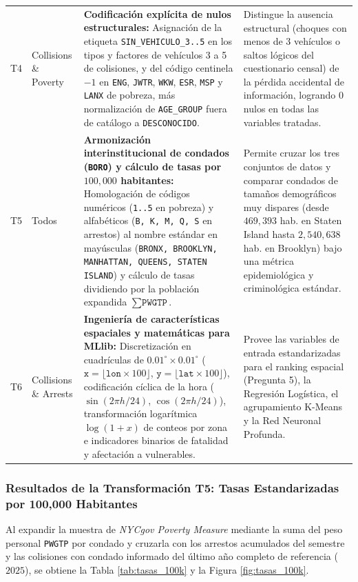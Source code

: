 \documentclass[11pt,a4paper]{article}
\begin{document}
\begin{table}[H]
\begin{tabularx}{\linewidth}{c l >{\raggedright\arraybackslash}p{4.3cm} X}
T4 & Collisions \& Poverty & \textbf{Codificación explícita de nulos estructurales:} Asignación de la etiqueta \texttt{SIN\_VEHICULO\_3..5} en los tipos y factores de vehículos 3 a 5 de colisiones, y del código centinela $-1$ en \texttt{ENG}, \texttt{JWTR}, \texttt{WKW}, \texttt{ESR}, \texttt{MSP} y \texttt{LANX} de pobreza, más normalización de \texttt{AGE\_GROUP} fuera de catálogo a \texttt{DESCONOCIDO}. & Distingue la ausencia estructural (choques con menos de 3 vehículos o saltos lógicos del cuestionario censal) de la pérdida accidental de información, logrando $0$ nulos en todas las variables tratadas. \\
T5 & Todos & \textbf{Armonización interinstitucional de condados (\texttt{BORO}) y cálculo de tasas por $100,000$ habitantes:} Homologación de códigos numéricos (\texttt{1..5} en pobreza) y alfabéticos (\texttt{B, K, M, Q, S} en arrestos) al nombre estándar en mayúsculas (\texttt{BRONX, BROOKLYN, MANHATTAN, QUEENS, STATEN ISLAND}) y cálculo de tasas dividiendo por la población expandida $\sum \texttt{PWGTP}$. & Permite cruzar los tres conjuntos de datos y comparar condados de tamaños demográficos muy dispares (desde $469,393$ hab. en Staten Island hasta $2,540,638$ hab. en Brooklyn) bajo una métrica epidemiológica y criminológica estándar. \\
T6 & Collisions \& Arrests & \textbf{Ingeniería de características espaciales y matemáticas para MLlib:} Discretización en cuadrículas de $0.01^\circ \times 0.01^\circ$ ($\texttt{x} = \lfloor \texttt{lon}\times 100\rfloor$, $\texttt{y} = \lfloor \texttt{lat}\times 100\rfloor$), codificación cíclica de la hora ($\sin(2\pi h/24)$, $\cos(2\pi h/24)$), transformación logarítmica $\log(1+x)$ de conteos por zona e indicadores binarios de fatalidad y afectación a vulnerables. & Provee las variables de entrada estandarizadas para el ranking espacial (Pregunta 5), la Regresión Logística, el agrupamiento K-Means y la Red Neuronal Profunda. \\
\bottomrule
\end{tabularx}
\end{table}

\subsubsection{Resultados de la Transformación T5: Tasas Estandarizadas por 100,000 Habitantes}

Al expandir la muestra de \textit{NYCgov Poverty Measure} mediante la suma del peso personal \texttt{PWGTP} por condado y cruzarla con los arrestos acumulados del semestre y las colisiones con condado informado del último año completo de referencia ($2025$), se obtiene la Tabla \ref{tab:tasas_100k} y la Figura \ref{fig:tasas_100k}.
\end{document}
